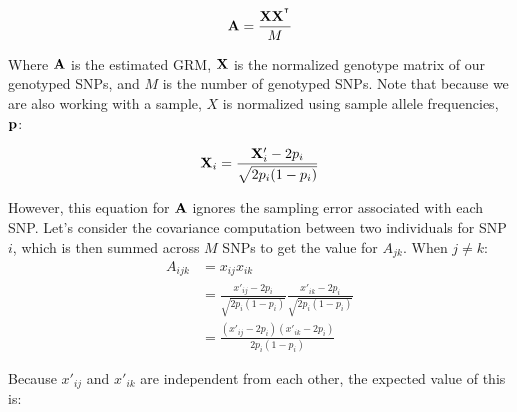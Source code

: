 \documentclass[12pt]{article}
\begin{document}
$$ \mathbf{A} = \frac{\mathbf{X} \mathbf{X}^{^\intercal}}{M} $$

Where $\mathbf{A}$ is the estimated GRM, $\mathbf{X}$ is the normalized genotype matrix of our genotyped SNPs, and $M$ is the number of genotyped SNPs.
Note that because we are also working with a sample, $X$ is normalized using sample allele frequencies, $\mathbf{p}$:

$$ \mathbf{X}_i = \frac{\mathbf{X}'_i - 2 p_i}{\sqrt{2 p_i (1 - p_i)}} $$

However, this equation for $\mathbf{A}$ ignores the sampling error associated with each SNP.
Let's consider the covariance computation between two individuals for SNP $i$, which is then summed across $M$ SNPs to get the value for $A_{jk}$.
When $j \neq k$:
\begin{align*}
    A_{ijk} &= x_{ij} x_{ik} \\
    &= \frac{x'_{ij} - 2 p_i}{\sqrt{2 p_i (1 - p_i)}}
    \frac{x'_{ik} - 2 p_i}{\sqrt{2 p_i (1 - p_i)}} \\
    &= \frac{(x'_{ij} - 2 p_i)(x'_{ik} - 2 p_i)}{2 p_i (1 - p_i)}
\end{align*}

Because $x'_{ij}$ and $x'_{ik}$ are independent from each other, the expected value of this is:
\end{document}
